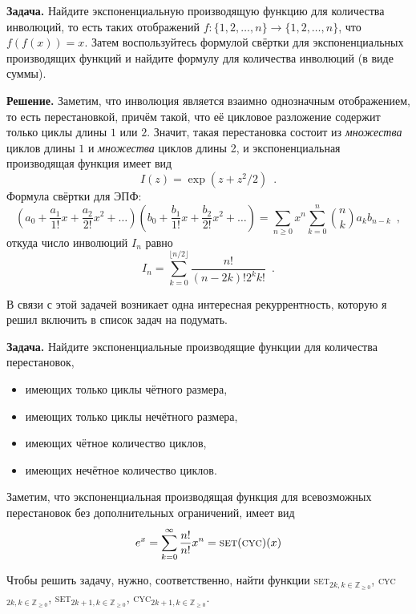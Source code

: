 \documentclass{article}
\theoremstyle{definition}
\begin{document}
\textbf{Задача.} Найдите экспоненциальную производящую функцию для количества 
инволюций, то есть таких отображений \( f \colon \{ 1, 2, \ldots, n \} \to \{ 
1, 2, \ldots, n \} \), что \( f(f(x)) = x \). Затем воспользуйтесь формулой 
свёртки для экспоненциальных производящих функций и найдите формулу для 
количества инволюций (в виде суммы).
  
\textbf{Решение.} Заметим, что инволюция является взаимно однозначным 
отображением, то есть перестановкой, причём такой, что её цикловое разложение 
содержит только циклы длины \( 1 \) или \( 2 \). Значит, такая перестановка 
состоит из \textit{множества} циклов длины \( 1 \) и \textit{множества} циклов 
длины 2, и экспоненциальная производящая функция имеет вид
\[
	I(z) = \exp \left(
		z + z^2/2
	\right) \enspace .
\]
Формула свёртки для ЭПФ:
\[
	\left(a_0 + \dfrac{a_1}{1!}x + \dfrac{a_2}{2!}x^2 + \ldots\right)
	\left(b_0 + \dfrac{b_1}{1!}x + \dfrac{b_2}{2!}x^2 + \ldots\right)	
= \sum_{n \geq 0} x^n \sum_{k = 0}^{n}{n \choose k} a_{k} b_{n-k} \enspace ,
\]
откуда число инволюций \( I_n \) равно
\[
	I_n = \sum_{k=0}^{\lfloor n/2 \rfloor}\dfrac{n!}{(n-2k)!2^k k!} \enspace .
\]

В связи с этой задачей возникает одна интересная рекуррентность, которую я решил включить в список задач на подумать.

\textbf{Задача.} Найдите экспоненциальные производящие функции для количества 
перестановок,
\begin{itemize}
	\item имеющих только циклы чётного размера,
	\item имеющих только циклы нечётного размера,
	\item имеющих чётное количество циклов,
	\item имеющих нечётное количество циклов.
\end{itemize}

Заметим, что экспоненциальная производящая функция для всевозможных перестановок
без дополнительных ограничений, имеет вид
\begin{equation}
    e^x = \sum_{k=0}^{\infty} \dfrac{n!}{n!}x^n =
\text{\textsc{set}}(\text{\textsc{cyc}})(x)
\end{equation}

Чтобы решить задачу, нужно, соответственно, найти функции
\textsc{set}$_{2k, k \in \mathbb Z_{\geq 0}}$, \textsc{cyc}$_{2k, k \in \mathbb Z_{\geq 0}}$,
\textsc{set}$_{2k + 1, k \in \mathbb Z_{\geq 0}}$, \textsc{cyc}$_{2k + 1, k \in \mathbb
Z_{\geq 0}}$.
\end{document}
